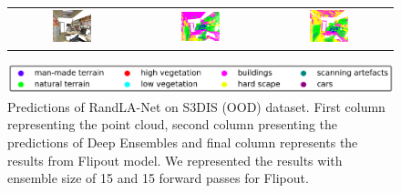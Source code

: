 \begin{figure}[h!]
\begin{tabular}{ccc}
            \includegraphics[width=0.33\textwidth, height=0.18\textheight]{images/seg_output/s3dis_DE/S3DIS_4_RGB.pdf} &
            \includegraphics[width=0.33\textwidth, height=0.18\textheight]{images/seg_output/s3dis_DE/S3DIS_4_Pred.pdf}&
            \includegraphics[width=0.33\textwidth, height=0.18\textheight]{images/seg_output/s3dis_DE/office_42.pdf} \\
        \end{tabular}
        \includegraphics[scale=0.45]{images/legend.png}
        \caption{Predictions of RandLA-Net on S3DIS (OOD) dataset. First column representing the point cloud, second column presenting the predictions of Deep Ensembles and final column represents the results from Flipout model.
        We represented the results with ensemble size of 15 and 15 forward passes for Flipout.}
        \label{fig:de_s3dis_vis}
    \end{figure}
